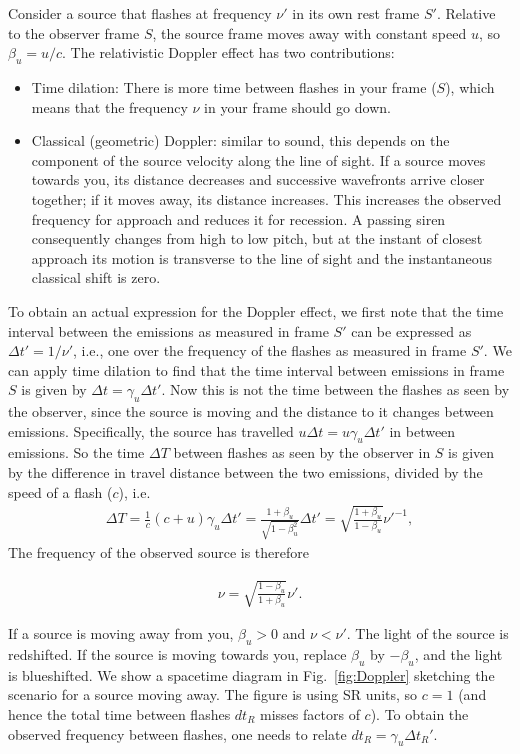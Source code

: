 \documentclass[12pt]{article}
\newcommand{\be}{\begin{eqnarray}}
\newcommand{\ee}{\end{eqnarray}}
\begin{document}
Consider a source that flashes at frequency $\nu'$ in its own rest frame $S'$. Relative to the observer frame $S$, the source frame moves away with constant speed $u$, so $\beta_u=u/c$.
The relativistic Doppler effect has two contributions:
\begin{itemize}
\item Time dilation: There is more time between flashes in your frame ($S$), which means that the frequency $\nu$ in your frame should go down.
\item Classical (geometric) Doppler: similar to sound, this depends on the component of the source velocity along the line of sight. If a source moves towards you, its distance decreases and successive wavefronts arrive closer together; if it moves away, its distance increases. This increases the observed frequency for approach and reduces it for recession. A passing siren consequently changes from high to low pitch, but at the instant of closest approach its motion is transverse to the line of sight and the instantaneous classical shift is zero.
\end{itemize}
To obtain an actual expression for the Doppler effect, we first note that the time interval between the emissions as measured in frame $S'$ can be expressed as $\Delta t' = 1/\nu'$, i.e., one over the frequency of the flashes as measured in frame $S'$. We can apply time dilation to find that the time interval between emissions in frame $S$ is given by $\Delta t = \gamma_u \Delta t'$. Now this is not the time between the flashes as seen by the observer, since the source is moving and the distance to it changes between emissions. Specifically, the source has travelled $u\Delta t=u\gamma_u\Delta t'$ in between emissions. So the time $\Delta T$ between flashes as seen by the observer in $S$ is given by the difference in travel distance between the two emissions, divided by the speed of a flash ($c$), i.e.
\be
\Delta T = \frac{1}{c}(c+u)\gamma_u \Delta t' = \frac{1+\beta_u}{\sqrt{1-\beta_u^2}} \Delta t' = \sqrt{\frac{1+\beta_u}{1-\beta_u}} \nu'^{-1}, \label{eq:Doppler}
\ee
The frequency of the observed source is therefore
\begin{tcolorbox}[colback=blue!5!white]
\vspace{-1.3em}
\be
\nu = \sqrt{\frac{1-\beta_u}{1+\beta_u}} \nu'.
\ee
\end{tcolorbox}
\noindent
If a source is moving away from you, $\beta_u>0$ and $\nu<\nu'$. The light of the source is redshifted. If the source is moving towards you, replace $\beta_u$ by $-\beta_u$, and the light is blueshifted. We show a spacetime diagram in Fig.~\ref{fig:Doppler} sketching the scenario for a source moving away. The figure is using SR units, so $c = 1$ (and hence the total time between flashes $d t_R$ misses factors of $c$). To obtain the observed frequency between flashes, one needs to relate $dt_R=\gamma_u\Delta t_R'$.
\end{document}
